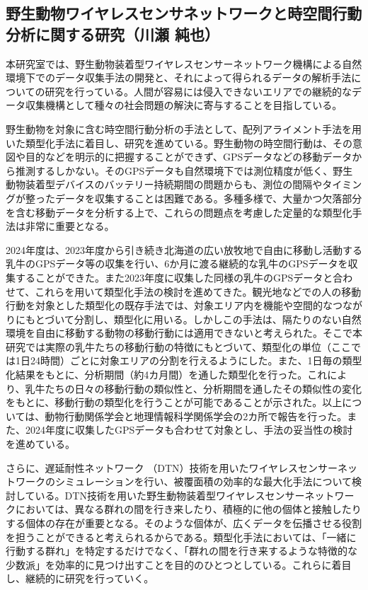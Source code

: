\subsection{野生動物ワイヤレスセンサネットワークと時空間行動分析に関する研究（川瀬 純也）}
本研究室では、野生動物装着型ワイヤレスセンサーネットワーク機構による自然環境下でのデータ収集手法の開発と、それによって得られるデータの解析手法についての研究を行っている。人間が容易には侵入できないエリアでの継続的なデータ収集機構として種々の社会問題の解決に寄与することを目指している。

野生動物を対象に含む時空間行動分析の手法として、配列アライメント手法を用いた類型化手法に着目し、研究を進めている。野生動物の時空間行動は、その意図や目的などを明示的に把握することができず、GPSデータなどの移動データから推測するしかない。そのGPSデータも自然環境下では測位精度が低く、野生動物装着型デバイスのバッテリー持続期間の問題からも、測位の間隔やタイミングが整ったデータを収集することは困難である。多種多様で、大量かつ欠落部分を含む移動データを分析する上で、これらの問題点を考慮した定量的な類型化手法は非常に重要となる。

2024年度は、2023年度から引き続き北海道の広い放牧地で自由に移動し活動する乳牛のGPSデータ等の収集を行い、6か月に渡る継続的な乳牛のGPSデータを収集することができた。また2023年度に収集した同様の乳牛のGPSデータと合わせて、これらを用いて類型化手法の検討を進めてきた。観光地などでの人の移動行動を対象とした類型化の既存手法では、対象エリア内を機能や空間的なつながりにもとづいて分割し、類型化に用いる。しかしこの手法は、隔たりのない自然環境を自由に移動する動物の移動行動には適用できないと考えられた。そこで本研究では実際の乳牛たちの移動行動の特徴にもとづいて、類型化の単位（ここでは1日24時間）ごとに対象エリアの分割を行えるようにした。また、1日毎の類型化結果をもとに、分析期間（約4カ月間）を通した類型化を行った。これにより、乳牛たちの日々の移動行動の類似性と、分析期間を通したその類似性の変化をもとに、移動行動の類型化を行うことが可能であることが示された。以上については、動物行動関係学会と地理情報科学関係学会の2カ所で報告を行った。\cite{kawase01, kawase02}また、2024年度に収集したGPSデータも合わせて対象とし、手法の妥当性の検討を進めている。

さらに、遅延耐性ネットワーク （DTN）技術を用いたワイヤレスセンサーネットワークのシミュレーションを行い、被覆面積の効率的な最大化手法について検討している。DTN技術を用いた野生動物装着型ワイヤレスセンサーネットワークにおいては、異なる群れの間を行き来したり、積極的に他の個体と接触したりする個体の存在が重要となる。そのような個体が、広くデータを伝播させる役割を担うことができると考えられるからである。類型化手法においては、「一緒に行動する群れ」を特定するだけでなく、「群れの間を行き来するような特徴的な少数派」を効率的に見つけ出すことを目的のひとつとしている。これらに着目し、継続的に研究を行っていく。